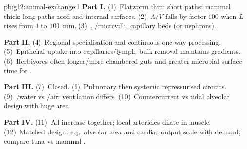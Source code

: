 \begin{solution}{pb:g12:animal-exchange:1}
\textbf{Part I.} (1)~Flatworm thin: short paths; mammal thick: long
paths need  and internal surfaces. (2)~$A/V$ falls by factor
$100$ when $L$ rises from $1$ to $100$~mm. (3)~, /microvilli,
capillary beds (or nephrons).

\textbf{Part II.} (4)~Regional specialisation and continuous one-way
processing. (5)~Epithelial uptake into capillaries/lymph; bulk removal
maintains gradients. (6)~Herbivores often longer/more chambered guts and
greater microbial surface time for .

\textbf{Part III.} (7)~Closed. (8)~Pulmonary then systemic repressurised
circuits. (9)~/water vs /air; ventilation differs.
(10)~Countercurrent vs tidal alveolar design with huge area.

\textbf{Part IV.} (11)~All increase together; local arterioles dilate in
muscle. (12)~Matched design: e.g.\ alveolar area and cardiac output
scale with demand; compare tuna  vs mammal .
\end{solution}
